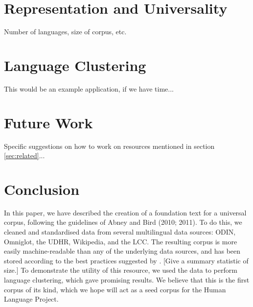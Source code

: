 \documentclass[11pt]{article}
\begin{document}
\section{Representation and Universality} \label{sec:stats}

Number of languages, size of corpus, etc.


\section{Language Clustering} \label{sec:cluster}

This would be an example application, if we have time...


\section{Future Work} \label{sec:future}

Specific suggestions on how to work on resources mentioned in section \ref{sec:related}...


\section{Conclusion} \label{sec:conclusion}

In this paper, we have described the creation of a foundation text for a universal corpus, following the guidelines of Abney and Bird (2010; 2011). To do this, we cleaned and standardised data from several multilingual data sources: ODIN, Omniglot, the UDHR, Wikipedia, and the LCC. The resulting corpus is more easily machine-readable than any of the underlying data sources, and has been stored according to the best practices suggested by . [Give a summary statistic of size.] To demonstrate the utility of this resource, we used the data to perform language clustering, which gave promising results. We believe that this is the first corpus of its kind, which we hope will act as a seed corpus for the Human Language Project.



\end{document}
